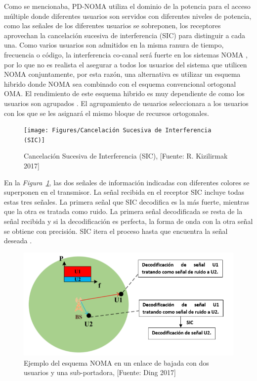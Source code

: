 Como se mencionaba, PD-NOMA utiliza el dominio de la potencia para el acceso múltiple donde diferentes usuarios son servidos con diferentes niveles de potencia, como las señales de los diferentes usuarios se sobreponen, los receptores aprovechan la cancelación sucesiva de interferencia (SIC) para distinguir a cada una. Como varios usuarios son admitidos en la misma ranura de tiempo, frecuencia o código, la interferencia co-canal será fuerte en los sistemas NOMA \parencite{Ding2016}, por lo que no es realista el asegurar a todos los usuarios del sistema que utilicen NOMA conjuntamente, por esta razón, una alternativa es utilizar un esquema hibrido donde NOMA sea combinado con el esquema convencional ortogonal OMA. El rendimiento de este esquema hibrido es muy dependiente de como los usuarios son agrupados \parencite{Ding2016}. El agrupamiento de usuarios seleccionara a los usuarios con los que se les asignará el mismo bloque de recursos ortogonales.\newline

\begin{figure}[th]
\centering
\texttt{[image: Figures/Cancelación Sucesiva de Interferencia (SIC)]}
\decoRule
\caption[Cancelación Sucesiva de Interferencia (SIC)]{Cancelación Sucesiva de Interferencia (SIC), [Fuente: R. Kizilirmak 2017]}
\label{fig:SIC}
\end{figure}

En la \textit{Figura~\ref{fig:SIC}}, las dos señales de información indicadas con diferentes colores se superponen en el transmisor. La señal recibida en el receptor SIC incluye todas estas tres señales. La primera señal que SIC decodifica es la más fuerte, mientras que la otra es tratada como ruido. La primera señal decodificada se resta de la señal recibida y si la decodificación es perfecta, la forma de onda con la otra señal se obtiene con precisión. SIC itera el proceso hasta que encuentra la señal deseada \parencite{Kizilirmak2016}.\newline

\begin{figure}[th]
\centering
\includegraphics[scale=1]{Figures/Ejemplo del esquema NOMA en un enlace de bajada con dos usuarios y una sub-portadora}
\decoRule
\caption[Ejemplo del esquema NOMA en un enlace de bajada con dos usuarios y una sub-portadora.]{Ejemplo del esquema NOMA en un enlace de bajada con dos usuarios y una sub-portadora, [Fuente: Ding 2017]}
\label{fig:NOMADL}
\end{figure}

